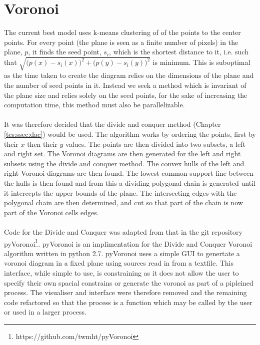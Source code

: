 \section{Voronoi}
The current best model uses k-means clustering of of the points to the center points. For every point (the plane is seen as a finite number of pixels) in the plane, $p$, it finds the seed point, $s_i$, which is the shortest distance to it, i.e. such that $\sqrt{\big(p(x)-s_i(x)\big)^2 + \big(p(y)-s_i(y)\big)^2}$ is minimum. This is suboptimal as the time taken to create the diagram relies on the dimensions of the plane and the number of seed points in it. Instead we seek a method which is invariant of the plane size and relies solely on the seed points, for the sake of increasing the computation time, this method must also be parallelizable. 
\\
\\
It was therefore decided that the divide and conquer method (Chapter \ref{tes:ssec:dac}) would be used. The algorithm works by ordering the points, first by their $x$ then their $y$ values. The points are then divided into two subsets, a left and right set. The Voronoi diagrams are then generated for the left and right subsets using the divide and conquer method. The convex hulls of the left and right Voronoi diagrams are then found. The lowest common support line between the hulls is then found and from this a dividing polygonal chain is generated until it intercepts the upper bounds of the plane. The intersecting edges with the polygonal chain are then determined, and cut so that part of the chain is now part of the Voronoi cells edges.
\\
\\
Code for the Divide and Conquer was adapted from that in the git repository pyVoronoi\footnote{https://github.com/twmht/pyVoronoi}. pyVoronoi is an implimentation for the Divide and Conquer Voronoi algorithm written in python 2.7. pyVoronoi uses a simple GUI to genertate a voronoi diagram in a fixed plane using sources read in from a textfile. This interface, while simple to use, is constraining as it does not allow the user to specify their own spacial constrains or generate the voronoi as part of a pipleined process. The visualiser and interface were therefore removed and the remaining code refactored so that the process is a function which may be called by the user or used in a larger process.

